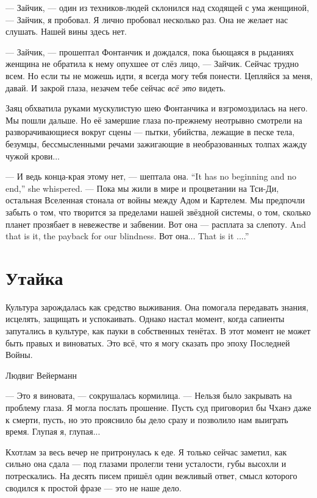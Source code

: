 --- Зайчик, --- один из техников-людей склонился над сходящей с ума женщиной, --- Зайчик, я пробовал.
Я лично пробовал несколько раз.
Она не желает нас слушать.
Нашей вины здесь нет.

--- Зайчик, --- прошептал Фонтанчик и дождался, пока бьющаяся в рыданиях женщина не обратила к нему опухшее от слёз лицо, --- Зайчик.
Сейчас трудно всем.
Но если ты не можешь идти, я всегда могу тебя понести.
Цепляйся за меня, давай.
И закрой глаза, незачем тебе сейчас \emph{всё это} видеть.

Заяц обхватила руками мускулистую шею Фонтанчика и взгромоздилась на него.
Мы пошли дальше.
Но её замершие глаза по-прежнему неотрывно смотрели на разворачивающиеся вокруг сцены --- пытки, убийства, лежащие в песке тела, безумцы, бессмысленными речами зажигающие в необразованных толпах жажду чужой крови...

{--- И ведь конца-края этому нет, --- шептала она.}
{``It has no beginning and no end,'' she whispered.}
--- Пока мы жили в мире и процветании на Тси-Ди, остальная Вселенная стонала от войны между Адом и Картелем.
Мы предпочли забыть о том, что творится за пределами нашей звёздной системы, о том, сколько планет прозябает в невежестве и забвении.
{Вот она --- расплата за слепоту.}
{And that is it, the payback for our blindness.}
{Вот она...}
{That is it ....''}

\section{Утайка}

\epigraph
{Культура зарождалась как средство выживания.
Она помогала передавать знания, исцелять, защищать и успокаивать.
Однако настал момент, когда сапиенты запутались в культуре, как пауки в собственных тенётах.
В этот момент не может быть правых и виноватых.
Это всё, что я могу сказать про эпоху Последней Войны.}
{Людвиг Вейерманн}

--- Это я виновата, --- сокрушалась кормилица.
--- Нельзя было закрывать на проблему глаза.
Я могла послать прошение.
Пусть суд приговорил бы Чханэ даже к смерти, пусть, но это прояснило бы дело сразу и позволило нам выиграть время.
Глупая я, глупая...

Кхотлам за весь вечер не притронулась к еде.
Я только сейчас заметил, как сильно она сдала --- под глазами пролегли тени усталости, губы высохли и потрескались.
На десять писем пришёл один вежливый ответ, смысл которого сводился к простой фразе --- это не наше дело.

